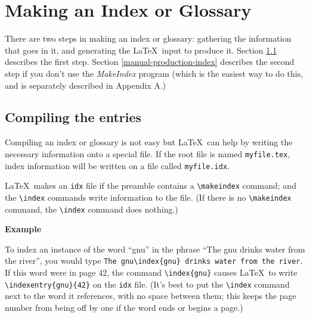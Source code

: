\documentclass{article}
\newcommand{\justtext}[1]{\texttt{\textbackslash #1}}
\begin{document}
\section{Making an Index or Glossary}

There are two steps in making an index or glossary: gathering the information that goes in it, and
generating the \LaTeX\ input to produce it. 
Section \ref{compiling-entries} describes the first step. 
Section \ref{manual-production-index} describes the second step if you don't use the 
\emph{MakeIndex} program (which is the easiest way to do this, and is separately described in 
Appendix A.)

\subsection{Compiling the entries}\label{compiling-entries}

Compiling an index or glossary is not easy but \LaTeX\ can help by writing the necessary information 
onto a special file. If the root file is named {\tt myfile.tex}, index information will be written 
on a file called {\tt myfile.idx}. 

\LaTeX\ makes an {\tt idx} file if the preamble contains a \justtext{makeindex} command; and the 
\justtext{index} commands write information to the file. 
(If there is no \justtext{makeindex} command, the \justtext{index} command does nothing.)

\noindent \textbf{Example} 

\bigskip

\noindent To index an instance of the word ``gnu'' in the phrase 
``The gnu drinks water from the river'', you would type 
{\tt The gnu\textbackslash index\{gnu\} drinks water from the river}.
If this word were in page 42, the command \justtext{index\{gnu\}} causes \LaTeX\ to write
\justtext{indexentry\{gnu\}\{42\}} on the {\tt idx} file. 
(It's best to put the \justtext{index} command next to the word it references, with no space
between them; this keeps the page number from being off by one if the word ends or begins a
page.)
\end{document}
